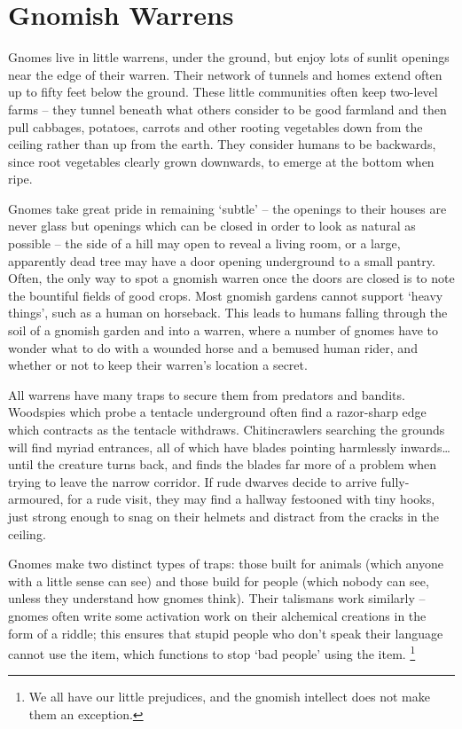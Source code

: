 \section[Gnomes]{Gnomish Warrens \Gn}
\label{gnomishWarrens}

\begin{multicols}{2}
\renewcommand\npcsymbol{\Gn}


\noindent
Gnomes live in little warrens, under the ground, but enjoy lots of sunlit openings near the edge of their warren.
Their network of tunnels and homes extend often up to fifty feet below the ground.
These little communities often keep two-level farms -- they tunnel beneath what others consider to be good farmland and then pull cabbages, potatoes, carrots and other rooting vegetables down from the ceiling rather than up from the earth.
They consider humans to be backwards, since root vegetables clearly grown downwards, to emerge at the bottom when ripe.

Gnomes take great pride in remaining `subtle' -- the openings to their houses are never glass but openings which can be closed in order to look as natural as possible -- the side of a hill may open to reveal a living room, or a large, apparently dead tree may have a door opening underground to a small pantry.
Often, the only way to spot a gnomish warren once the doors are closed is to note the bountiful fields of good crops.
Most gnomish gardens cannot support `heavy things', such as a human on horseback.
This leads to humans falling through the soil of a gnomish garden and into a warren, where a number of gnomes have to wonder what to do with a wounded horse and a bemused human rider, and whether or not to keep their warren's location a secret.

All warrens have many traps to secure them from predators and bandits.
Woodspies which probe a tentacle underground often find a razor-sharp edge which contracts as the tentacle withdraws.
Chitincrawlers searching the grounds will find myriad entrances, all of which have blades pointing harmlessly inwards\ldots until the creature turns back, and finds the blades far more of a problem when trying to leave the narrow corridor.
If rude dwarves decide to arrive fully-armoured, for a rude visit, they may find a hallway festooned with tiny hooks, just strong enough to snag on their helmets and distract from the cracks in the ceiling.

Gnomes make two distinct types of traps: those built for animals (which anyone with a little sense can see) and those build for people (which nobody can see, unless they understand how gnomes think).
Their \glspl{talisman} work similarly -- gnomes often write some activation work on their alchemical creations in the form of a riddle; this ensures that stupid people who don't speak their language cannot use the item, which functions to stop `bad people' using the item.%
\footnote{We all have our little prejudices, and the gnomish intellect does not make them an exception.}


\end{multicols}
